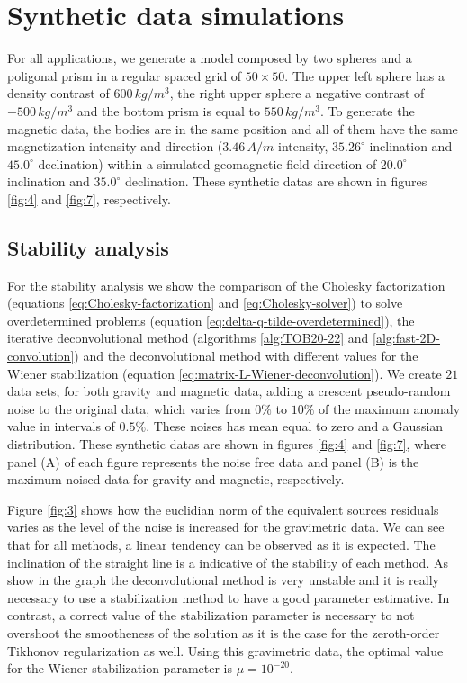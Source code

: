 \section{Synthetic data simulations}
\label{sec:synthetic_simulations}

For all applications, we generate a model composed by two spheres and a poligonal prism in a regular spaced grid of $50 \times 50$. The upper left sphere has a density contrast of $600 \, kg/m^3$, the right upper sphere a negative contrast of $-500 \, kg/m^3$ and the bottom prism is equal to $550 \, kg/m^3$. To generate the magnetic data, the bodies are in the same position and all of them have the same magnetization intensity and direction ($3.46 \, A/m$ intensity, $35.26^{\circ}$ inclination and $45.0^{\circ}$ declination) within a simulated geomagnetic field direction of $20.0^{\circ}$ inclination and $35.0^{\circ}$ declination. These synthetic datas are shown in figures \ref{fig:4} and \ref{fig:7}, respectively.

\subsection{Stability analysis}

For the stability analysis we show the comparison of the Cholesky factorization (equations \ref{eq:Cholesky-factorization} and \ref{eq:Cholesky-solver}) to solve overdetermined problems (equation \ref{eq:delta-q-tilde-overdetermined}), the iterative deconvolutional method (algorithms \ref{alg:TOB20-22} and \ref{alg:fast-2D-convolution}) and the deconvolutional method with different values for the Wiener stabilization (equation \ref{eq:matrix-L-Wiener-deconvolution}). We create $21$ data sets, for both gravity and magnetic data, adding a crescent pseudo-random noise to the original data, which varies from $0\%$ to $10\%$ of the maximum anomaly value in intervals of $0.5\%$. These noises has mean equal to zero and a Gaussian distribution. These synthetic datas are shown in figures \ref{fig:4} and \ref{fig:7}, where panel (A) of each figure represents the noise free data and panel (B) is the maximum noised data for gravity and magnetic, respectively.
		
Figure \ref{fig:3} shows how the euclidian norm of the equivalent sources residuals varies as the level of the noise is increased for the gravimetric data. We can see that for all methods, a linear tendency can be observed as it is expected. The inclination of the straight line is a indicative of the stability of each method. As show in the graph the deconvolutional method is very unstable and it is really necessary to use a stabilization method to have a good parameter estimative. In contrast, a correct value of the stabilization parameter is necessary to not overshoot the smootheness of the solution as it is the case for the zeroth-order Tikhonov regularization as well. Using this gravimetric data, the optimal value for the Wiener stabilization parameter is $\mu = 10^{-20}$. 

